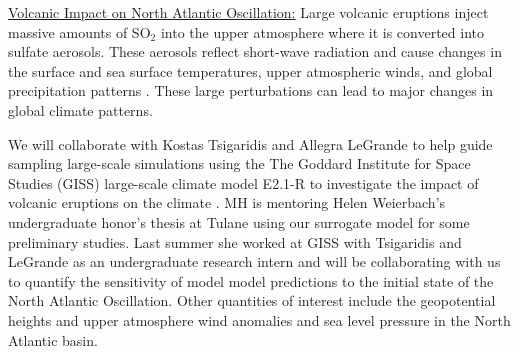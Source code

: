 \documentclass[11pt]{NSFamsart}
\begin{document}
  
\underline{Volcanic Impact on North Atlantic Oscillation:}
Large volcanic eruptions inject massive amounts of SO${}_2$ into the upper atmosphere where it is converted into sulfate aerosols.  These aerosols reflect short-wave radiation and cause changes in the surface and sea surface temperatures, upper atmospheric winds, and  global precipitation patterns \cite{zanchettin2013background, legrande2015volcanic}.  
These large perturbations can lead to  major changes in global climate patterns.

We will collaborate with Kostas Tsigaridis and Allegra LeGrande to help guide sampling large-scale simulations using the The Goddard Institute for Space Studies (GISS) large-scale climate model E2.1-R to investigate the impact of volcanic eruptions on the climate
\cite{zanchettin2016model}.  MH is mentoring Helen Weierbach's undergraduate honor's thesis at Tulane using our surrogate model for some preliminary studies.  Last summer she worked at GISS with Tsigaridis and LeGrande as an undergraduate research intern and will be collaborating with us to quantify the sensitivity of model model predictions to the initial state of the North Atlantic Oscillation. Other quantities of interest include the geopotential heights and upper atmosphere wind anomalies and sea level pressure in the North Atlantic basin. 
\end{document}
